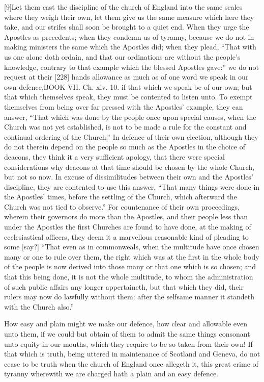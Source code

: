 [9]Let them cast the discipline of the church of England into the same scales where they weigh their own, let them give us the same measure which here they take, and our strifes shall soon be brought to a quiet end. When they urge the Apostles as precedents; when they condemn us of tyranny, because we do not in making ministers the same which the Apostles did; when they plead, “That with us one alone doth ordain, and that our ordinations are without the people’s knowledge, contrary to that example which the blessed Apostles gave:” we do not request at their [228] hands allowance as much as of one word we speak in our own defence,BOOK VII. Ch. xiv. 10. if that which we speak be of our own; but that which themselves speak, they must be contented to listen unto. To exempt themselves from being over far pressed with the Apostles’ example, they can answer, “That which was done by the people once upon special causes, when the Church was not yet established, is not to be made a rule for the constant and continual ordering of the Church.” In defence of their own election, although they do not therein depend on the people so much as the Apostles in the choice of deacons, they think it a very sufficient apology, that there were special considerations why deacons at that time should be chosen by the whole Church, but not so now. In excuse of dissimilitudes between their own and the Apostles’ discipline, they are contented to use this answer, “That many things were done in the Apostles’ times, before the settling of the Church, which afterward the Church was not tied to observe.” For countenance of their own proceedings, wherein their governors do more than the Apostles, and their people less than under the Apostles the first Churches are found to have done, at the making of ecclesiastical officers, they deem it a marvellous reasonable kind of pleading to some [say?] “That even as in commonweals, when the multitude have once chosen many or one to rule over them, the right which was at the first in the whole body of the people is now derived into those many or that one which is so chosen; and that this being done, it is not the whole multitude, to whom the administration of such public affairs any longer appertaineth, but that which they did, their rulers may now do lawfully without them: after the selfsame manner it standeth with the Church also.”

How easy and plain might we make our defence, how clear and allowable even unto them, if we could but obtain of them to admit the same things consonant unto equity in our mouths, which they require to be so taken from their own! If that which is truth, being uttered in maintenance of Scotland and Geneva, do not cease to be truth when the church of England once allegeth it, this great crime of tyranny wherewith we are charged hath a plain and an easy defence.


